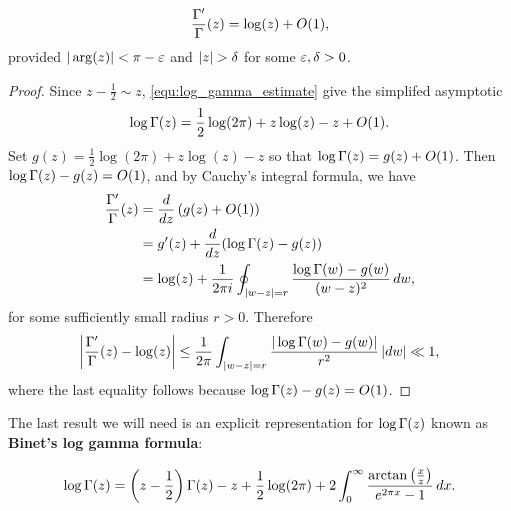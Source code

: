       \begin{proposition}\label{equ:approximtion_for_digamma}
      \[
        \frac{\Gamma'}{\Gamma}(z) = \log(z)+O(1),
      \]
      provided $|\arg(z)| < \pi-\varepsilon$ and $|z| > \delta$ for some $\varepsilon,\delta > 0$.
      \end{proposition}
      \begin{proof}
        Since $z-\frac{1}{2} \sim z$, \cref{equ:log_gamma_estimate} give the simplifed asymptotic
        \[
          \log\Gamma(z) = \frac{1}{2}\log(2\pi)+z\log(z)-z+O(1).
        \]
        Set $g(z) = \frac{1}{2}\log(2\pi)+z\log(z)-z$ so that $\log\Gamma(z) = g(z)+O(1)$. Then $\log\Gamma(z)-g(z) = O(1)$, and by Cauchy's integral formula, we have
        \begin{align*}
          \frac{\Gamma'}{\Gamma}(z) &= \frac{d}{dz}\left(g(z)+O(1)\right) \\
          &= g'(z)+\frac{d}{dz}(\log\Gamma(z)-g(z)) \\
          &= \log(z)+\frac{1}{2\pi i}\oint_{|w-z| = r}\frac{\log\Gamma(w)-g(w)}{(w-z)^{2}}\,dw,
        \end{align*}
        for some sufficiently small radius $r > 0$. Therefore
        \[
          \left|\frac{\Gamma'}{\Gamma}(z)-\log(z)\right| \le \frac{1}{2\pi}\int_{|w-z| = r}\frac{|\log\Gamma(w)-g(w)|}{r^{2}}\,|dw| \ll 1,
        \]
        where the last equality follows because $\log\Gamma(z)-g(z) = O(1)$.
      \end{proof}

      The last result we will need is an explicit representation for $\log\Gamma(z)$ known as \textbf{Binet's log gamma formula}:

      \begin{proposition}
        \phantom{ }
        \[
          \log\Gamma(z) = \left(z-\frac{1}{2}\right)\Gamma(z)-z+\frac{1}{2}\log(2\pi)+2\int_{0}^{\infty}\frac{\arctan\left(\frac{x}{z}\right)}{e^{2\pi x}-1}\,dx.
        \]
      \end{proposition}